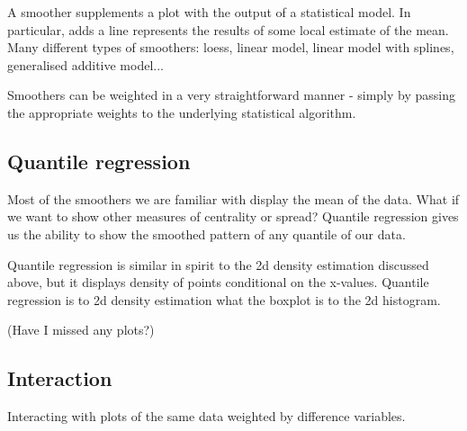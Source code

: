 \documentclass[oneside,letterpaper]{scrartcl}
\begin{document}
A smoother supplements a plot with the output of a statistical model.  In particular, adds a line represents the results of some local estimate of the mean.  Many different types of smoothers: loess, linear model, linear model with splines, generalised additive model...

Smoothers can be weighted in a very straightforward manner - simply by passing the appropriate weights to the underlying statistical algorithm.

\subsection{Quantile regression}\label{sub:quantile_regression}

Most of the smoothers we are familiar with display the mean of the data.  What if we want to show other measures of centrality or spread?  Quantile regression gives us the ability to show the smoothed pattern of any quantile of our data.

Quantile regression is similar in spirit to the 2d density estimation discussed above, but it displays density of points conditional on the x-values.  Quantile regression is to 2d density estimation what the boxplot is to the 2d histogram.

(Have I missed any plots?)

\subsection{Interaction}\label{sub:interaction} %

Interacting with plots of the same data weighted by difference variables.


\end{document}

